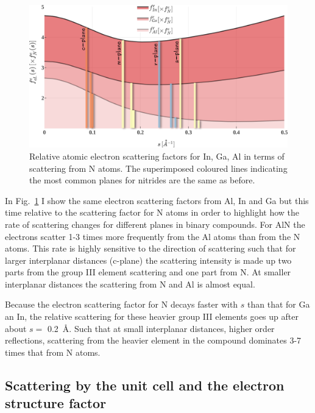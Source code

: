 \begin{figure}
    \centering
\includegraphics[width=1\linewidth]{Figures/scatterFactor_eRel.png}
\caption{Relative atomic electron scattering factors for In, Ga, Al in terms of scattering from N atoms. The superimposed coloured lines indicating the most common planes for nitrides are the same as before. }
\label{Fig:scatterFactor_eRel}
\end{figure}

In Fig.~\ref{Fig:scatterFactor_eRel} I show the same electron scattering factors from Al, In and Ga but this time relative to the scattering factor for N atoms in order to highlight how the rate of scattering changes for different planes in binary compounds. For AlN the electrons scatter 1-3 times more frequently from the Al atoms than from the N atoms. This rate is highly sensitive to the direction of scattering such that for larger interplanar distances (c-plane) the scattering intensity is made up two parts from the group III element scattering and one part from N. At smaller interplanar distances the scattering from N and Al is almost equal. 


Because the electron scattering factor for N decays faster with $s$ than that for Ga an In, the relative scattering for these heavier group III elements goes up after about $s=$ \SI{0.2}{\angstrom}. Such that at small interplanar distances, \eg higher order reflections, scattering from the heavier element in the compound dominates 3-7 times that from N atoms. 



%
\subsection{Scattering by the unit cell and the electron structure factor}
\label{sec:strucFact}

